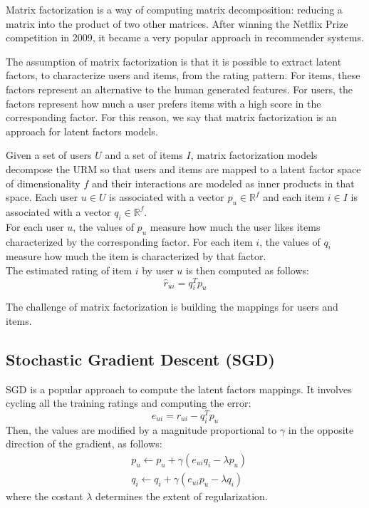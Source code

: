 Matrix factorization \cite{10.1109/MC.2009.263} is a way of computing matrix decomposition: reducing a matrix into the product of two other matrices. After winning the Netflix Prize competition in 2009, it became a very popular approach in recommender systems.\par
The assumption of matrix factorization is that it is possible to extract latent factors, to characterize users and items, from the rating pattern. For items, these factors represent an alternative to the human generated features. For users, the factors represent how much a user prefers items with a high score in the corresponding factor. For this reason, we say that matrix factorization is an approach for latent factors models.\par
Given a set of users $U$ and a set of items $I$, matrix factorization models decompose the URM so that users and items are mapped to a latent factor space of dimensionality $f$ and their interactions are modeled as inner products in that space. Each user $u \in U$ is associated with a vector $p_u \in \mathbb{R}^f$ and each item $i \in I$ is associated with a vector $q_i \in \mathbb{R}^f$.\\
For each user $u$, the values of $p_u$ measure how much the user likes items characterized by the corresponding factor. For each item $i$, the values of $q_i$ measure how much the item is characterized by that factor.\\
The estimated rating of item $i$ by user $u$ is then computed as follows:
\[ \hat{r}_{ui} = q_i^T p_u \]\par
The challenge of matrix factorization is building the mappings for users and items.


\subsection{Stochastic Gradient Descent (SGD)}

SGD is a popular approach \cite{ImprovingSVD, 10.1145/1401890.1401944, 10.1145/1345448.1345466} to compute the latent factors mappings. It involves cycling all the training ratings and computing the error:
\[ e_{ui} = r_{ui} - q_i^T p_u \]
Then, the values are modified by a magnitude proportional to $\gamma$ in the opposite direction of the gradient, as follows:
\begin{equation*}
\begin{split}
& p_u \leftarrow p_u + \gamma (e_{ui} q_i - \lambda p_u) \\
& q_i \leftarrow q_i + \gamma (e_{ui} p_u - \lambda q_i)
\end{split}
\end{equation*}
where the costant $\lambda$ determines the extent of regularization.



